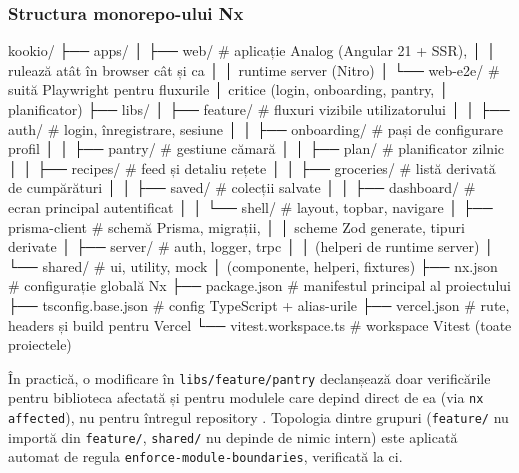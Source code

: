 \subsubsection{Structura monorepo-ului Nx}\label{subsec:structura-monorepo}
\vspace{0.3cm}
\begin{TreeVerb}
kookio/
├── apps/
│   ├── web/                    # aplicație Analog (Angular 21 + SSR),
│   │                             rulează atât în browser cât și ca
│   │                             runtime server (Nitro)
│   └── web-e2e/                # suită Playwright pentru fluxurile
│                                 critice (login, onboarding, pantry,
│                                 planificator)
├── libs/
│   ├── feature/                # fluxuri vizibile utilizatorului
│   │   ├── auth/               #   login, înregistrare, sesiune
│   │   ├── onboarding/         #   pași de configurare profil
│   │   ├── pantry/             #   gestiune cămară
│   │   ├── plan/               #   planificator zilnic
│   │   ├── recipes/            #   feed și detaliu rețete
│   │   ├── groceries/          #   listă derivată de cumpărături
│   │   ├── saved/              #   colecții salvate
│   │   ├── dashboard/          #   ecran principal autentificat
│   │   └── shell/              #   layout, topbar, navigare
│   ├── prisma-client           # schemă Prisma, migrații,
│   │                             scheme Zod generate, tipuri derivate
│   ├── server/                 # auth, logger, trpc
│   │                             (helperi de runtime server)
│   └── shared/                 # ui, utility, mock
│                                 (componente, helperi, fixtures)
├── nx.json                     # configurație globală Nx
├── package.json                # manifestul principal al proiectului
├── tsconfig.base.json          # config TypeScript + alias-urile
├── vercel.json                 # rute, headers și build pentru Vercel
└── vitest.workspace.ts         # workspace Vitest (toate proiectele)
\end{TreeVerb}
\vspace{0.3cm}

În practică, o modificare în \texttt{libs/feature/pantry} declanșează doar verificările pentru biblioteca afectată și pentru modulele care depind direct de ea (via \texttt{nx affected}), nu pentru întregul repository \cite{nx}. Topologia dintre grupuri (\texttt{feature/} nu importă din \texttt{feature/}, \texttt{shared/} nu depinde de nimic intern) este aplicată automat de regula \texttt{enforce-module-boundaries}, verificată la \acrshort{ci}.

